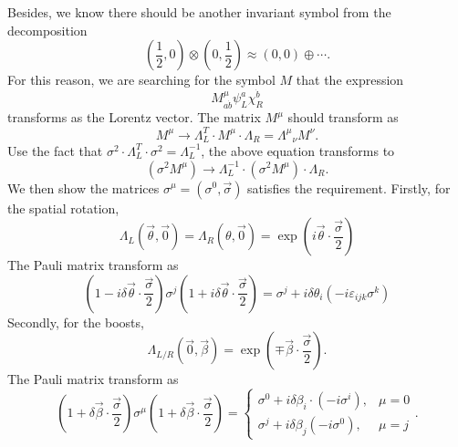 Besides, we know there should be another invariant symbol from the decomposition
\begin{equation*}
	\left(\frac{1}{2}, 0\right) \otimes \left(0,\frac{1}{2}\right)
	\approx \left(0, 0\right) \oplus \cdots.
\end{equation*}
For this reason, we are searching for the symbol $M$ that the expression
\begin{equation*}
	M^\mu_{a\dot b} \psi^a_L \chi^{\dot b}_R
\end{equation*}
transforms as the Lorentz vector.
The matrix $M^\mu$ should transform as
\begin{equation*}
	M^\mu \longrightarrow \Lambda_L^T \cdot M^\mu \cdot \Lambda_R = {\Lambda^\mu}_\nu M^\nu.
\end{equation*}
Use the fact that $\sigma^2 \cdot \Lambda_L^T \cdot \sigma^2 = \Lambda_L^{-1}$, the above equation transforms to
\begin{equation*}
	\left(\sigma^2 M^\mu\right) \longrightarrow \Lambda_L^{-1} \cdot \left(\sigma^2 M^\mu\right)\cdot \Lambda_R.
\end{equation*}
We then show the matrices $\sigma^\mu = (\sigma^0,\vec\sigma)$ satisfies the requirement.
Firstly, for the spatial rotation,
\begin{equation}
	\Lambda_L(\vec\theta,\vec 0) = \Lambda_R(\theta,\vec 0) = \exp\left(i\vec\theta\cdot \frac{\vec\sigma}{2}\right)
\end{equation}
The Pauli matrix transform as
\begin{equation*}
	\left(1-i\delta\vec\theta\cdot\frac{\vec\sigma}{2}\right)\sigma^j\left(1+i\delta\vec\theta\cdot \frac{\vec\sigma}{2}\right)
	= \sigma^j + i\delta\theta_i \left(-i \varepsilon_{ijk}\sigma^k \right)
\end{equation*}
Secondly, for the boosts,
\begin{equation}
	\Lambda_{L/R}(\vec 0, \vec\beta) = 
	\exp\left(\mp\vec\beta\cdot \frac{\vec\sigma}{2}\right).
\end{equation}
The Pauli matrix transform as
\begin{equation*}
	\left(1+\delta\vec\beta\cdot\frac{\vec\sigma}{2}\right)\sigma^\mu \left(1+\delta\vec\beta\cdot \frac{\vec\sigma}{2}\right) = \begin{cases}
		 \sigma^0 + i\delta\beta_i \cdot (-i\sigma^i), & \mu = 0 \\
		 \sigma^j + i\delta\beta_j (-i\sigma^0), & \mu = j
	\end{cases}.
\end{equation*}
